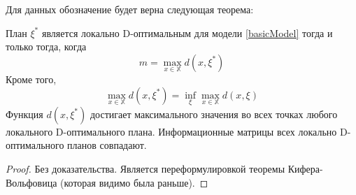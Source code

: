 Для данных обозначение будет верна следующая теорема:
\begin{thm}[Эквивалентности]
План $\xi^*$ является локально D-оптимальным для модели \eqref{basicModel} тогда и только тогда, когда 
$$ m = \max\limits_{x\in \mathbb{X}} d(x, \xi^*)$$
Кроме того, 
$$ \max \limits_{x \in \mathbb{X}} d(x, \xi^*) = \inf\limits_{\xi}\max\limits_{x\in\mathbb{X}} d(x, \xi)$$
Функция $d(x, \xi^*)$ достигает максимального значения во всех точках любого локального D-оптимального плана.
Информационные матрицы всех локально D-оптимального планов совпадают.
\end{thm}
\begin{proof}
Без доказательства. Является переформулировкой теоремы Кифера-Вольфовица (которая видимо была раньше).
\end{proof}



